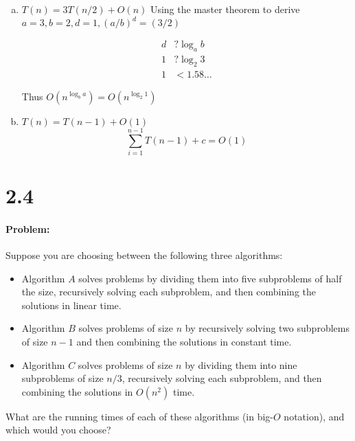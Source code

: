 \documentclass[12pt]{article}
\newcommand{\BigO}[1]{\ensuremath{O(#1)}}
\begin{document}
\begin{enumerate}[(a)]
\item $T(n) = 3T(n/2) + \BigO{n}$
Using the master theorem to derive $a=3, b=2, d=1, (a/b)^d = (3/2)$

\begin{align*}
d &? \log_a b \\
1 &? \log_2 3 \\
1 &< 1.58\dots
\end{align*}

Thus
$\BigO{n^{\log_b a}} = \BigO{n^{\log_2 1}}$

\item $T(n) = T(n - 1) + \BigO{1}$
$$\sum_{i=1}^{n - 1} T(n - 1) + c = O(1)$$
\end{enumerate}

\section*{2.4}
\paragraph{Problem:}
Suppose you are choosing between the following three algorithms:

\begin{itemize}
\item Algorithm $A$ solves problems by dividing them into five subproblems
of half the size, recursively solving each subproblem, and then
combining the solutions in linear time.

\item Algorithm $B$ solves problems of size $n$ by recursively solving two
subproblems of size $n−1$ and then combining the solutions in constant
time.

\item Algorithm $C$ solves problems of size $n$ by dividing them into nine
subproblems of size $n/3$, recursively solving each subproblem, and then
combining the solutions in $\BigO{n^2}$ time.
\end{itemize}

\noindent What are the running times of each of these algorithms (in
big-$O$
notation), and which would you choose?
\end{document}
